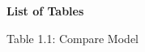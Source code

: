 \begin{adjustwidth}{0.2cm}{0.2cm}

    \begin{center}
        {\englishfont\fontsize{14pt}{21pt}\selectfont \textbf{List of Tables} \par}
    \end{center}
    \label{lot}

    \vspace{1cm}
    \setlength{\parindent}{0pt}
    \vspace{0.3cm}
    {\large Table 1.1: Compare Model\dotfill\pageref{abstract}\hspace{0.1cm}\par}

\end{adjustwidth}